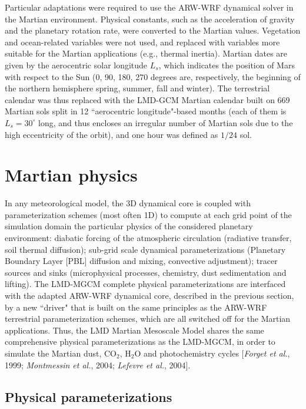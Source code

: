 \sk
Particular adaptations were required to use the ARW-WRF dynamical solver in the Martian environment. Physical constants, such as the acceleration of gravity and the planetary rotation rate, were converted to the Martian values. Vegetation and ocean-related variables were not used, and replaced with variables more suitable for the Martian applications (e.g., thermal inertia). Martian dates are given by the aerocentric solar longitude $L_s$, which indicates the position of Mars with respect to the Sun (0, 90, 180, 270 degrees are, respectively, the beginning of the northern hemisphere spring, summer, fall and winter). The terrestrial calendar was thus replaced with the LMD-GCM Martian calendar built on 669 Martian sols split in 12 ``aerocentric longitude"-based months (each of them is $L_s=30^{\circ}$ long, and thus encloses an irregular number of Martian sols due to the high eccentricity of the orbit), and one hour was defined as $1/24$ sol.

\mk
\section{Martian physics}

\sk
In any meteorological model, the 3D dynamical core is coupled with parameterization schemes (most often 1D) to compute at each grid point of the simulation domain the particular physics of the considered planetary environment: diabatic forcing of the atmospheric circulation (radiative transfer, soil thermal diffusion); sub-grid scale dynamical parameterizations (Planetary Boundary Layer [PBL] diffusion and mixing, convective adjustment); tracer sources and sinks (microphysical processes, chemistry, dust sedimentation and lifting). The LMD-MGCM complete physical parameterizations are interfaced with the adapted ARW-WRF dynamical core, described in the previous section, by a new ``driver" that is built on the same principles as the ARW-WRF terrestrial parameterization schemes, which are all switched off for the Martian applications. Thus, the LMD Martian Mesoscale Model shares the same comprehensive physical parameterizations as the LMD-MGCM, in order to simulate the Martian dust, CO$_2$, H$_2$O and photochemistry cycles [\textit{Forget et al.}, 1999; \textit{Montmessin et al.}, 2004; \textit{Lefevre et al.}, 2004].

\sk
\subsection{Physical parameterizations}

